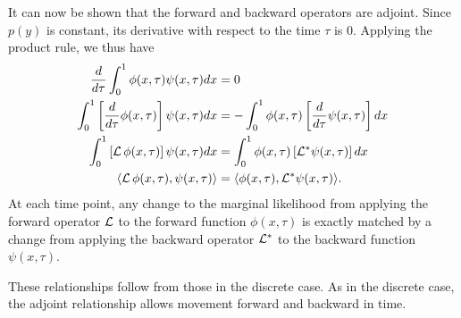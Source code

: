\documentclass[preprint]{elsarticle}
\begin{document}
It can now be shown that the forward and backward operators are adjoint. Since $p(y)$ is constant, its derivative with respect to the time $\tau$ is $0$. Applying the product rule, we thus have
\begin{equation}\label{eq:adjoint_continuous}
\begin{split}
\frac{d}{d\tau}\int_{0}^{1} \phi(x,\tau) \psi(x,\tau)dx &= 0\\
\int_{0}^{1} \left[\frac{d}{d\tau} \phi(x,\tau)\right] \psi(x,\tau)dx &= -\int_{0}^{1} \phi(x,\tau) \left[\frac{d}{d\tau} \psi(x,\tau)\right] dx\\
\int_{0}^{1} \left[{\cal L}\,\phi(x,\tau)\right] \psi(x,\tau)dx &= \int_{0}^{1}  \phi(x,\tau) \left[{\cal L}^{*} \psi(x,\tau)\right] dx\\
\langle{\cal L}\,\phi(x,\tau), \psi(x,\tau)\rangle &= \langle \phi(x,\tau),{\cal L}^{*} \psi(x,\tau)\rangle.
\end{split}
\end{equation}
At each time point, any change to the marginal likelihood from applying the forward operator ${\cal L}$ to the forward function $\phi(x,\tau)$ is exactly matched by a change from applying the backward operator ${\cal L}^{*}$ to the backward function $\psi(x,\tau)$. 

These relationships follow from those in the discrete case. As in the discrete case, the adjoint relationship allows movement forward and backward in time. 
\end{document}
